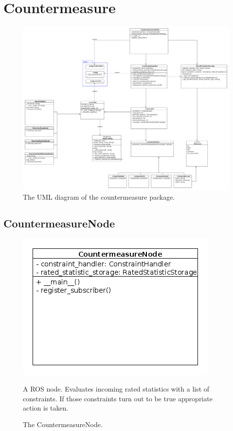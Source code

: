 \newpage
\section{Countermeasure}
\begin{figure}[!ht]
\begin{center}
\includegraphics[width=1.0\linewidth]{./diagram_pictures/reactor/reactor.png}
\caption{The UML diagram of the countermeasure package.}
\end{center}
\end{figure}

\mbox{}

\newpage


\newpage
\subsection{CountermeasureNode}
\begin{figure}[htbp]
	\begin{minipage}[t]{8cm}
		\vspace{0pt}
		\centering
		\includegraphics[scale=0.6]{./diagram_pictures/reactor/CountermeasureNode.png}
		\caption{The CountermeasureNode.}
	\end{minipage}
	\hfill
	\begin{minipage}[t]{8cm}
		\vspace{10pt}
			A ROS node. Evaluates incoming rated statistics with a list of constraints. If those constraints turn out to be true appropriate action is taken.
	\end{minipage}
\end{figure}  


